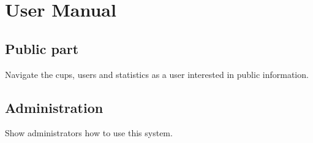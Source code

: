 \chapter{User Manual}
\section{Public part}
Navigate the cups, users and statistics as a user interested in public information.
\section{Administration}
Show administrators how to use this system.